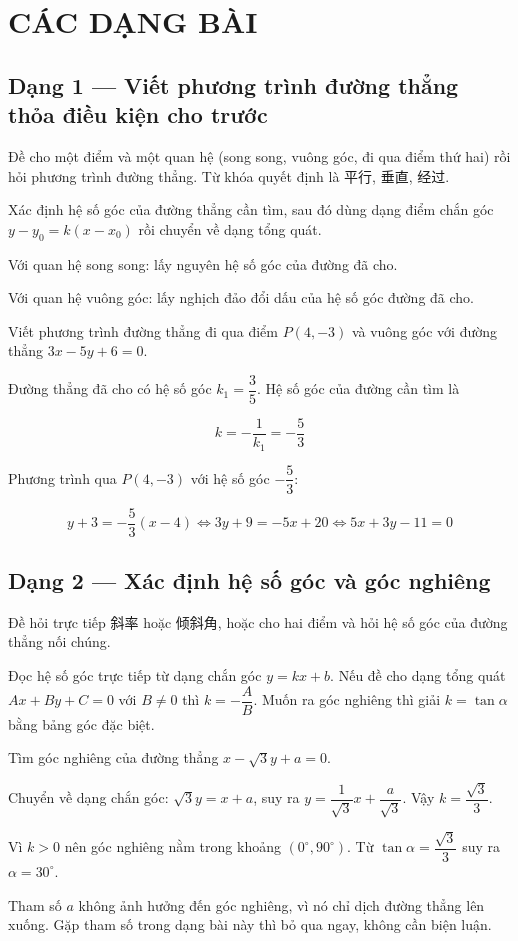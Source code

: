 \documentclass[11pt, a4paper]{article}
\begin{document}
\section{CÁC DẠNG BÀI}

\subsection{Dạng 1 — Viết phương trình đường thẳng thỏa điều kiện cho trước}

 Đề cho một điểm và một quan hệ (song song, vuông góc, đi qua điểm thứ hai) rồi hỏi phương trình đường thẳng. Từ khóa quyết định là 平行, 垂直, 经过.

 Xác định hệ số góc của đường thẳng cần tìm, sau đó dùng dạng điểm chắn góc $y - y_0 = k(x - x_0)$ rồi chuyển về dạng tổng quát.

Với quan hệ song song: lấy nguyên hệ số góc của đường đã cho.

Với quan hệ vuông góc: lấy nghịch đảo đổi dấu của hệ số góc đường đã cho.

\begin{vidu}[{1}]
Viết phương trình đường thẳng đi qua điểm $P(4, -3)$ và vuông góc với đường thẳng $3x - 5y + 6 = 0$.

Đường thẳng đã cho có hệ số góc $k_1 = \dfrac{3}{5}$. Hệ số góc của đường cần tìm là

$$k = -\frac{1}{k_1} = -\frac{5}{3}$$

Phương trình qua $P(4, -3)$ với hệ số góc $-\dfrac{5}{3}$:

$$y + 3 = -\frac{5}{3}(x - 4) \iff 3y + 9 = -5x + 20 \iff 5x + 3y - 11 = 0$$

\end{vidu}
\subsection{Dạng 2 — Xác định hệ số góc và góc nghiêng}

 Đề hỏi trực tiếp 斜率 hoặc 倾斜角, hoặc cho hai điểm và hỏi hệ số góc của đường thẳng nối chúng.

 Đọc hệ số góc trực tiếp từ dạng chắn góc $y = kx + b$. Nếu đề cho dạng tổng quát $Ax + By + C = 0$ với $B \ne 0$ thì $k = -\dfrac{A}{B}$. Muốn ra góc nghiêng thì giải $k = \tan\alpha$ bằng bảng góc đặc biệt.

\begin{vidu}[{2}]
Tìm góc nghiêng của đường thẳng $x - \sqrt{3}y + a = 0$.

Chuyển về dạng chắn góc: $\sqrt{3}y = x + a$, suy ra $y = \dfrac{1}{\sqrt{3}}x + \dfrac{a}{\sqrt{3}}$. Vậy $k = \dfrac{\sqrt{3}}{3}$.

Vì $k > 0$ nên góc nghiêng nằm trong khoảng $(0^\circ, 90^\circ)$. Từ $\tan\alpha = \dfrac{\sqrt{3}}{3}$ suy ra $\alpha = 30^\circ$.

 Tham số $a$ không ảnh hưởng đến góc nghiêng, vì nó chỉ dịch đường thẳng lên xuống. Gặp tham số trong dạng bài này thì bỏ qua ngay, không cần biện luận.

\end{vidu}
\end{document}
